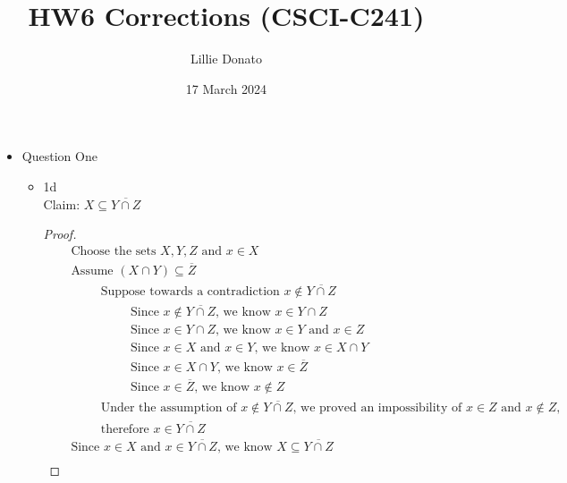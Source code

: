 \documentclass{article}
\title{HW6 Corrections (CSCI-C241)}
\author{Lillie Donato}
\date{17 March 2024}
\begin{document}
\maketitle

\begin{itemize}
    \item Question One
    \begin{itemize}
        \item 1d \\
        Claim: $X \subseteq \overline{Y \cap Z}$
        \begin{proof}
            \begin{align}
                &\quad \text{Choose the sets } X, Y, Z \text{ and } x \in X \\
                &\quad \text{Assume } (X \cap Y) \subseteq \overline{Z} \\
                &\quad \hspace{1cm} \text{Suppose towards a contradiction } x \notin \overline{Y \cap Z} \\
                &\quad \hspace{2cm} \text{Since } x \notin \overline{Y \cap Z} \text{, we know } x \in Y \cap Z \\
                &\quad \hspace{2cm} \text{Since } x \in Y \cap Z \text{, we know } x \in Y \text{ and } x \in Z \\
                &\quad \hspace{2cm} \text{Since } x \in X \text{ and } x \in Y \text{, we know } x \in X \cap Y \\
                &\quad \hspace{2cm} \text{Since } x \in X \cap Y \text{, we know } x \in \overline{Z} \\
                &\quad \hspace{2cm} \text{Since } x \in \overline{Z} \text{, we know } x \notin Z \\
                &\quad \hspace{1cm} \text{Under the assumption of } x \notin \overline{Y \cap Z} \text{, we proved an impossibility of } x \in Z \text{ and } x \notin Z, \\
                &\quad \hspace{1cm} \text{therefore } x \in \overline{Y \cap Z} \nonumber \\
                &\quad \text{Since } x \in X \text{ and } x \in \overline{Y \cap Z} \text{, we know } X \subseteq \overline{Y \cap Z} \\

\end{align}
\end{proof}
\end{itemize}
\end{itemize}
\end{document}
